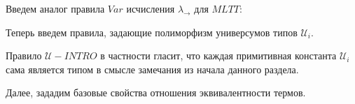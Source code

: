 \documentclass{article}[12pt]
\begin{document}
Введем аналог правила $Var$ исчисления $\lambda_\rightarrow$ для $MLTT$:
\begin{prooftree}
\end{prooftree}

Теперь введем правила, задающие полиморфизм универсумов типов $\mathcal U_i$.
\begin{multicols}{2}
    \begin{prooftree}
    \end{prooftree}
    \begin{prooftree}
    \end{prooftree}
\end{multicols}
Правило $\mathcal U-INTRO$ в частности гласит, что каждая примитивная константа $\mathcal U_i$ сама является
типом в смысле замечания из начала данного раздела.

Далее, зададим базовые свойства отношения эквивалентности термов.
\begin{multicols}{2}
    \begin{prooftree}
    \end{prooftree}
    \begin{prooftree}
    \end{prooftree}
\end{multicols}
\begin{prooftree}
\end{prooftree}
\begin{multicols}{2}
    \begin{prooftree}
    \end{prooftree}
    \begin{prooftree}
    \end{prooftree}
\end{multicols}
\end{document}
